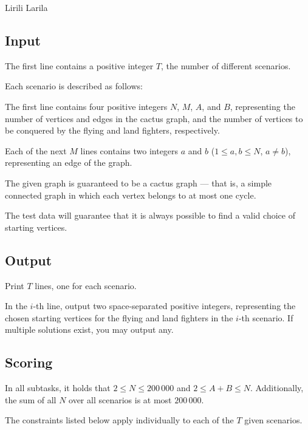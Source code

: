 \begin{statement}[
  problempoints=100,
  timelimit=2 seconds,
  memorylimit=512 MiB,
]{Lirili Larila}
\subsection*{Input}

The first line contains a positive integer $T$, the number of different scenarios.

Each scenario is described as follows:

The first line contains four positive integers $N$, $M$, $A$, and $B$, representing 
the number of vertices and edges in the cactus graph, and the number of vertices 
to be conquered by the flying and land fighters, respectively.

Each of the next $M$ lines contains two integers $a$ and $b$ ($1 \leq a, b \leq N$, $a \neq b$),  
representing an edge of the graph.

The given graph is guaranteed to be a cactus graph — that is, a simple connected graph 
in which each vertex belongs to at most one cycle.

The test data will guarantee that it is always possible to find a valid choice of starting vertices.

\subsection*{Output}

Print $T$ lines, one for each scenario.

In the $i$-th line, output two space-separated positive integers,
representing the chosen starting vertices for the flying and land fighters 
in the $i$-th scenario.  
If multiple solutions exist, you may output any.

\subsection*{Scoring}

In all subtasks, it holds that $2 \leq N \leq 200\,000$ and $2 \leq A + B \leq N$.  
Additionally, the sum of all $N$ over all scenarios is at most $200\,000$.

The constraints listed below apply individually to each of the $T$ given scenarios.


\end{statement}
